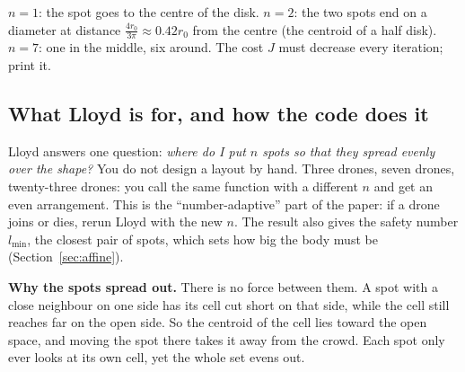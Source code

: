 \documentclass[11pt,a4paper]{article}
\begin{document}
\begin{testbox}
$n=1$: the spot goes to the centre of the disk. $n=2$: the two spots end on a diameter at distance $\tfrac{4r_0}{3\pi}
\approx0.42r_0$ from the centre (the centroid of a half disk). $n=7$: one in the middle, six around. The cost $J$ must
decrease every iteration; print it.
\end{testbox}

\subsection{What Lloyd is for, and how the code does it}

\begin{plainbox}
Lloyd answers one question: \emph{where do I put $n$ spots so that they spread evenly over the shape?} You do not
design a layout by hand. Three drones, seven drones, twenty-three drones: you call the same function with a different
$n$ and get an even arrangement. This is the ``number-adaptive'' part of the paper: if a drone joins or dies, rerun
Lloyd with the new $n$. The result also gives the safety number $l_{\min}$, the closest pair of spots, which sets how
big the body must be (Section~\ref{sec:affine}).
\end{plainbox}

\textbf{Why the spots spread out.} There is no force between them. A spot with a close neighbour on one side has its
cell cut short on that side, while the cell still reaches far on the open side. So the centroid of the cell lies
toward the open space, and moving the spot there takes it away from the crowd. Each spot only ever looks at its own
cell, yet the whole set evens out.
\end{document}
